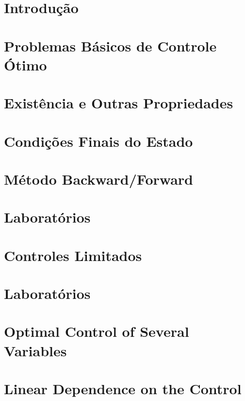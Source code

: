 \documentclass[a4paper, 11pt, oneside]{book}
\theoremstyle{definition}
\begin{document}


\tableofcontents

\chapter{Introdução}
\label{ch:intro}


\chapter{Problemas Básicos de Controle Ótimo}
\label{ch:1}


\chapter{Existência e Outras Propriedades}
\label{ch:2}


\chapter{Condições Finais do Estado}
\label{ch:3}


\chapter{Método Backward/Forward}
\label{ch:4}


\chapter{Laboratórios}


\chapter{Controles Limitados}


\chapter{Laboratórios}


\chapter{Optimal Control of Several Variables}


\chapter{Linear Dependence on the Control}



\end{document}
